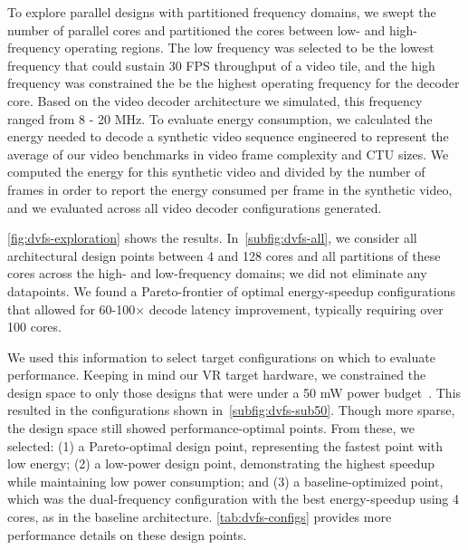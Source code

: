 To explore parallel designs with partitioned frequency domains, we swept the number of parallel cores and partitioned the cores between low- and high-frequency operating regions.
The low frequency was selected to be the lowest frequency that could sustain 30 FPS throughput of a video tile, and the high frequency was constrained the be the highest operating frequency for the decoder core.
Based on the video decoder architecture we simulated, this frequency ranged from 8 - 20 MHz.
To evaluate energy consumption, we calculated the energy needed to decode a synthetic video sequence engineered to represent the average of our video benchmarks in video frame complexity and CTU sizes.
We computed the energy for this synthetic video and divided by the number of frames in order to report the energy consumed per frame in the synthetic video, and we evaluated across all video decoder configurations generated.

\ref{fig:dvfs-exploration} shows the results. In~\ref{subfig:dvfs-all}, we consider all architectural design points between 4 and 128 cores and all partitions of these cores across the high- and low-frequency domains; we did not eliminate any datapoints.
We found a Pareto-frontier of optimal energy-speedup configurations that allowed for 60-100$\times$ decode latency improvement, typically requiring over 100 cores.

We used this information to select target configurations on which to evaluate \nameArch performance.
Keeping in mind our VR target hardware, we constrained the design space to only those designs that were under a 50 mW power budget~\cite{tikekar18ijssc}.
This resulted in the configurations shown in~\ref{subfig:dvfs-sub50}.
Though more sparse, the design space still showed performance-optimal points.
From these, we selected: (1) a Pareto-optimal design point, representing the fastest point with low energy; (2) a low-power design point, demonstrating the highest speedup while maintaining low power consumption; and (3) a baseline-optimized point, which was the dual-frequency configuration with the best energy-speedup using 4 cores, as in the baseline architecture.
\ref{tab:dvfs-configs} provides more performance details on these design points.

\dvfsConfigTable
